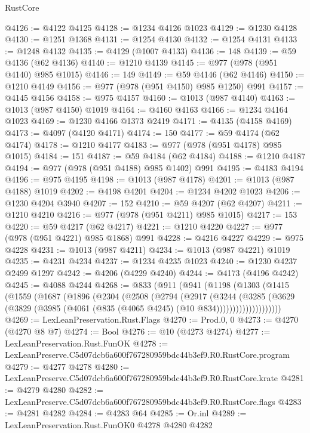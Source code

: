 \begin{lexlean}{RustCore}
\begin{coremodule}
@4126 := @4122 @4125
@4128 := @1234 @4126 @1023
@4129 := @1230 @4128
@4130 := @1251 @1368
@4131 := @1254 @4130
@4132 := @1254 @4131
@4133 := @1248 @4132
@4135 := @4129 (@1007 @4133)
@4136 := 148
@4139 := @59 @4136 (@62 @4136)
@4140 := @1210 @4139
@4145 := @977 (@978 (@951 @4140) @985 @1015)
@4146 := 149
@4149 := @59 @4146 (@62 @4146)
@4150 := @1210 @4149
@4156 := @977 (@978 (@951 @4150) @985 @1250) @991
@4157 := @4145 @4156
@4158 := @975 @4157
@4160 := @1013 (@987 @4140)
@4163 := @1013 (@987 @4150) @1019
@4164 := @4160 @4163
@4166 := @1234 @4164 @1023
@4169 := @1230 @4166 @1373 @2419
@4171 := @4135 (@4158 @4169)
@4173 := @4097 (@4120 @4171)
@4174 := 150
@4177 := @59 @4174 (@62 @4174)
@4178 := @1210 @4177
@4183 := @977 (@978 (@951 @4178) @985 @1015)
@4184 := 151
@4187 := @59 @4184 (@62 @4184)
@4188 := @1210 @4187
@4194 := @977 (@978 (@951 @4188) @985 @1402) @991
@4195 := @4183 @4194
@4196 := @975 @4195
@4198 := @1013 (@987 @4178)
@4201 := @1013 (@987 @4188) @1019
@4202 := @4198 @4201
@4204 := @1234 @4202 @1023
@4206 := @1230 @4204 @3940
@4207 := 152
@4210 := @59 @4207 (@62 @4207)
@4211 := @1210 @4210
@4216 := @977 (@978 (@951 @4211) @985 @1015)
@4217 := 153
@4220 := @59 @4217 (@62 @4217)
@4221 := @1210 @4220
@4227 := @977 (@978 (@951 @4221) @985 @1868) @991
@4228 := @4216 @4227
@4229 := @975 @4228
@4231 := @1013 (@987 @4211)
@4234 := @1013 (@987 @4221) @1019
@4235 := @4231 @4234
@4237 := @1234 @4235 @1023
@4240 := @1230 @4237 @2499 @1297
@4242 := @4206 (@4229 @4240)
@4244 := @4173 (@4196 @4242)
@4245 := @4088 @4244
@4268 := @833
    (@911
      (@941
        (@1198
          (@1303
            (@1415
              (@1559
                (@1687
                  (@1896
                    (@2304
                      (@2508
                        (@2794
                          (@2917
                            (@3244
                              (@3285
                                (@3629
                                  (@3829
                                    (@3985 (@4061 (@835 (@4065 @4245) (@10 @834))))))))))))))))))))
@4269 := LexLeanPreservation.Rust.Flags
@4270 := Prod.{0, 0}
@4273 := @4270 (@4270 @8 @7)
@4274 := Bool
@4276 := @10 (@4273 @4274)
@4277 := LexLeanPreservation.Rust.FunOK
@4278 := LexLeanPreserve.C5d07dcb6a600f767280959bdc44b3ef9.R0.RustCore.program
@4279 := @4277 @4278
@4280 := LexLeanPreserve.C5d07dcb6a600f767280959bdc44b3ef9.R0.RustCore.krate
@4281 := @4279 @4280
@4282 := LexLeanPreserve.C5d07dcb6a600f767280959bdc44b3ef9.R0.RustCore.flags
@4283 := @4281 @4282
@4284 := @4283 @64
@4285 := Or.inl
@4289 := LexLeanPreservation.Rust.FunOK0 @4278 @4280 @4282

\end{coremodule}
\end{lexlean}
